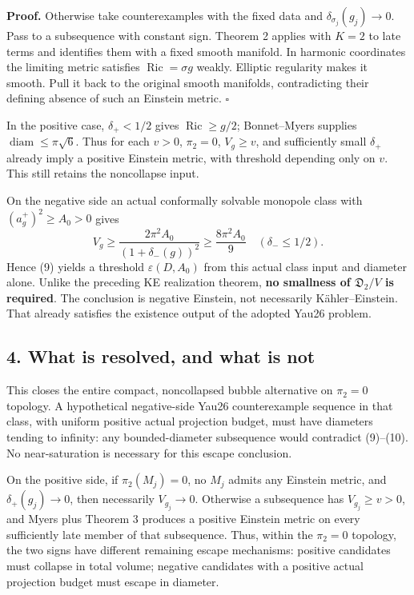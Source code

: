 \documentclass[
  11pt,
]{article}
\begin{document}
\textbf{Proof.} Otherwise take counterexamples with the fixed data and
\(\delta_{\sigma_j}(g_j)\to0\). Pass to a subsequence with constant
sign. Theorem 2 applies with \(K=2\) to late terms and identifies them
with a fixed smooth manifold. In harmonic coordinates the limiting
metric satisfies \(\operatorname{Ric}=\sigma g\) weakly. Elliptic
regularity makes it smooth. Pull it back to the original smooth
manifolds, contradicting their defining absence of such an Einstein
metric. \(\square\)

In the positive case, \(\delta_+<1/2\) gives
\(\operatorname{Ric}\ge g/2\); Bonnet--Myers supplies
\(\operatorname{diam}\le\pi\sqrt6\). Thus for each \(v>0\), \(\pi_2=0\),
\(V_g\ge v\), and sufficiently small \(\delta_+\) already imply a
positive Einstein metric, with threshold depending only on \(v\). This
still retains the noncollapse input.

On the negative side an actual conformally solvable monopole class with
\((a_g^+)^2\ge A_0>0\) gives \[
 V_g\ge\frac{2\pi^2 A_0}{(1+\delta_-(g))^2}
       \ge\frac{8\pi^2 A_0}{9}\quad(\delta_-\le1/2).
 \tag{10}
\] Hence (9) yields a threshold \(\varepsilon(D,A_0)\) from this actual
class input and diameter alone. Unlike the preceding KE realization
theorem, \textbf{no smallness of \(\mathfrak D_2/V\) is required}. The
conclusion is negative Einstein, not necessarily Kähler--Einstein. That
already satisfies the existence output of the adopted Yau26 problem.

\hypertarget{what-is-resolved-and-what-is-not}{%
\subsection{4. What is resolved, and what is
not}\label{what-is-resolved-and-what-is-not}}

This closes the entire compact, noncollapsed bubble alternative on
\(\pi_2=0\) topology. A hypothetical negative-side Yau26 counterexample
sequence in that class, with uniform positive actual projection budget,
must have diameters tending to infinity: any bounded-diameter
subsequence would contradict (9)--(10). No near-saturation is necessary
for this escape conclusion.

On the positive side, if \(\pi_2(M_j)=0\), no \(M_j\) admits any
Einstein metric, and \(\delta_+(g_j)\to0\), then necessarily
\(V_{g_j}\to0\). Otherwise a subsequence has \(V_{g_j}\ge v>0\), and
Myers plus Theorem 3 produces a positive Einstein metric on every
sufficiently late member of that subsequence. Thus, within the
\(\pi_2=0\) topology, the two signs have different remaining escape
mechanisms: positive candidates must collapse in total volume; negative
candidates with a positive actual projection budget must escape in
diameter.
\end{document}
